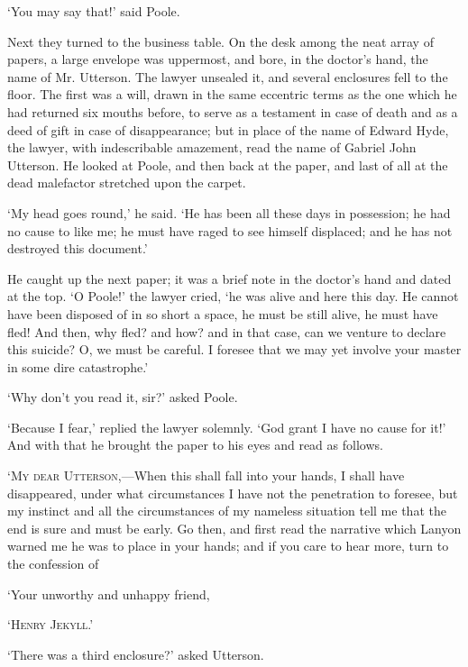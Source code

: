 \documentclass[]{novel}
\begin{document}
‘You may say that!’ said Poole.

Next they turned to the business table. On the desk among the neat array of papers, a large envelope was uppermost, and bore, in the doctor’s hand, the name of Mr. Utterson. The lawyer unsealed it, and several enclosures fell to the floor. The first was a will, drawn in the same eccentric terms as the one which he had returned six mouths before, to serve as a testament in case of death and as a deed of gift in case of disappearance; but in place of the name of Edward Hyde, the lawyer, with indescribable amazement, read the name of Gabriel John Utterson. He looked at Poole, and then back at the paper, and last of all at the dead malefactor stretched upon the carpet.

‘My head goes round,’ he said. ‘He has been all these days in possession; he had no cause to like me; he must have raged to see himself displaced; and he has not destroyed this document.’

He caught up the next paper; it was a brief note in the doctor’s hand and dated at the top. ‘O Poole!’ the lawyer cried, ‘he was alive and here this day. He cannot have been disposed of in so short a space, he must be still alive, he must have fled! And then, why fled? and how? and in that case, can we venture to declare this suicide? O, we must be careful. I foresee that we may yet involve your master in some dire catastrophe.’

‘Why don’t you read it, sir?’ asked Poole.

‘Because I fear,’ replied the lawyer solemnly. ‘God grant I have no cause for it!’ And with that he brought the paper to his eyes and read as follows.\par\null

\begin{parascale}[0.9]
\textsc{‘My dear Utterson,—}When this shall fall into your hands, I shall have disappeared, under what circumstances I have not the penetration to foresee, but my instinct and all the circumstances of my nameless situation tell me that the end is sure and must be early. Go then, and first read the narrative which Lanyon warned me he was to place in your hands; and if you care to hear more, turn to the confession of

‘Your unworthy and unhappy friend,\hfill\null

\stake\hfill\textsc{‘Henry Jekyll.’}
\end{parascale}

‘There was a third enclosure?’ asked Utterson.
\end{document}
